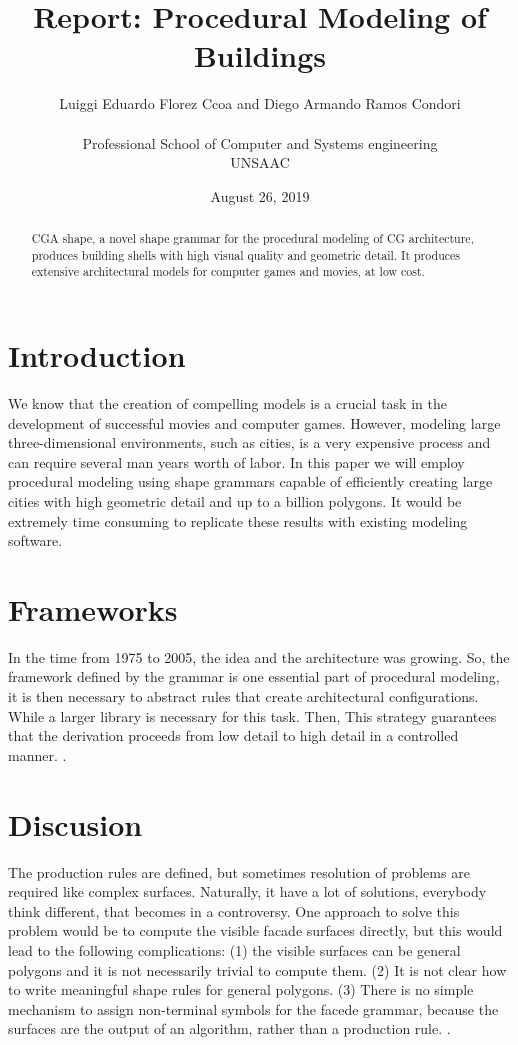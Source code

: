 \documentclass{article}
\title{Report: Procedural Modeling of Buildings}
\author{ Luiggi Eduardo Florez Ccoa and Diego Armando Ramos Condori \\ \\
  Professional School of Computer and Systems engineering\\
  UNSAAC\\
}
\date{August 26, 2019}
\begin{document}
\maketitle

\begin{abstract}
CGA shape, a novel shape grammar for the procedural modeling of
CG architecture, produces building shells with high visual quality
and geometric detail. It produces extensive architectural models for
computer games and movies, at low cost.
\end{abstract}

\section{Introduction}

We know that the creation of compelling models is a crucial task in the development of successful movies and computer games. However, modeling large three-dimensional environments, such as cities, is a very expensive process and can require several man years worth of labor. In this paper we will employ procedural modeling using shape
grammars capable of efficiently creating large cities with high geometric detail and up to a billion polygons. It would be extremely
time consuming to replicate these results with existing modeling
software.

\section{Frameworks}

In the time from 1975 to 2005, the idea and the architecture  was growing. So, the framework defined by the grammar is one essential
part of procedural modeling, it is then necessary to abstract
rules that create architectural configurations. While a larger library is necessary for this task. Then, This strategy guarantees that the derivation proceeds from low detail to high detail in a controlled manner. \cite{SIPSER}.

\section{Discusion}

The production rules are defined, but sometimes resolution of problems are required like complex surfaces.
Naturally, it have a lot of solutions, everybody think different, that becomes in a controversy. One approach to solve this
problem would be to compute the visible facade surfaces directly,
but this would lead to the following complications: (1) the visible
surfaces can be general polygons and it is not necessarily trivial
to compute them.
(2) It is not clear how to write
meaningful shape rules for general polygons. 
(3) There is no simple mechanism to assign non-terminal symbols for the facede grammar, because the surfaces are the output of an algorithm, rather than
a production rule. \cite{BibStyles}.
\end{document}
